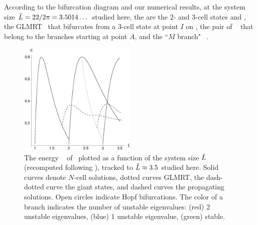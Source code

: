 According to the bifurcation diagram 
and our numerical results, 
at the system size $\tilde{L}=22/2\pi = 3.5014\dots$
studied here,
the {\eqva} are the $2$- and $3$-cell states  and ,
the GLMRT \eqv\ that bifurcates from a $3$-cell state at point $I$
on ,
the pair of \reqva\  
that belong to the branches starting at point
$A$,
and the ``$M$ branch"  \reqva\ .

\begin{figure}[t]		\label{fig:ksBifDiag}
\begin{center} 
\includegraphics[width=0.5\textwidth]{figs/ksBifDiag.eps}
\end{center}
\caption{
The energy \expctE\    of \eqva\
plotted as a function of the system size
$\tilde{L}$ (recomputed following ), tracked to
$\tilde{L} \approx 3.5$ studied here.
Solid curves denote $N$-cell solutions,
dotted curves GLMRT, the dash-dotted curve the
giant states, and dashed curves the propagating solutions.
Open circles indicate Hopf bifurcations. 
The color of a branch indicates the number of unstable
eigenvalues: (red) 2 unstable eigenvalues, (blue) 1
unstable eigenvalue, (green) stable. 
        }
\end{figure}

